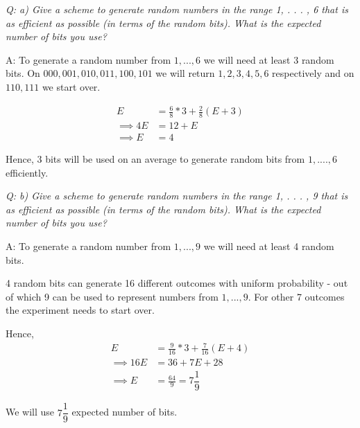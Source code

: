 \documentclass{homeworg}
\begin{document}
\newpage

\exercise
\emph {Q: a) Give a scheme to generate random numbers in the range 1, . . . , 6 that is as efficient as possible
(in terms of the random bits). What is the expected number of bits you use?}

A: To generate a random number from $1, ..., 6$ we will need at least 3 random bits. 
On $000, 001,010,011, 100,101$  we will return $1,2,3,4,5,6$ respectively and on $110,111$ we start over.

\begin{align*}
E   &= \frac{6}{8} \ast 3 + \frac{2}{8} (E + 3)\\
\implies 4E  &= 12 + E \\
\implies E  &= 4
\end{align*} 


Hence, $3$ bits will be used on an average to generate random bits from $1,....,6$ efficiently. 

\emph {Q: b)  Give a scheme to generate random numbers in the range 1, . . . , 9 that is as efficient as possible
(in terms of the random bits). What is the expected number of bits you use?}

A: To generate a random number from $1, ..., 9$ we will need at least 4 random bits.

4 random bits can generate 16 different  outcomes with uniform probability - out of which 9 can be used to represent numbers from $1, ..., 9$. For other 7 outcomes the experiment needs to start over. 

Hence,
\begin{align*}
    E & = \frac{9}{16} \ast 3 + \frac{7}{16} (E+4)\\
    \implies 16E & = 36 + 7E + 28\\
    \implies E & = \frac{64}{9} = 7\dfrac{1}{9} 
\end{align*}

We will use $7\dfrac{1}{9}$ expected number of bits.
\newpage

\exercise
\end{document}
